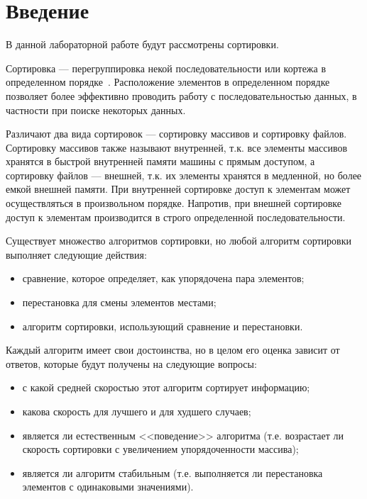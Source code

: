 \chapter*{Введение}

В данной лабораторной работе будут рассмотрены сортировки.

Сортировка --- перегруппировка некой последовательности или кортежа в определенном порядке~\cite{book_sort_algorithms}.
Расположение элементов в определенном порядке позволяет более эффективно проводить работу с последовательностью данных, в частности при поиске некоторых данных.

Различают два вида сортировок --- сортировку массивов и сортировку файлов.
Сортировку массивов также называют внутренней, т.к. все элементы массивов хранятся в быстрой внутренней памяти машины с прямым доступом, а сортировку файлов --- внешней, т.к. их элементы хранятся в медленной, но более емкой внешней памяти.
При внутренней сортировке доступ к элементам может осуществляться в произвольном порядке.
Напротив, при внешней сортировке доступ к элементам производится в строго определенной последовательности.

Существует множество алгоритмов сортировки, но любой алгоритм сортировки выполняет следующие действия:
\begin{itemize}
	\item сравнение, которое определяет, как упорядочена пара элементов;
	\item перестановка для смены элементов местами;
	\item алгоритм сортировки, использующий сравнение и перестановки.
\end{itemize}

Каждый алгоритм имеет свои достоинства, но в целом его оценка зависит от ответов, которые будут получены на следующие вопросы:
\begin{itemize}
	\item с какой средней скоростью этот алгоритм сортирует информацию;
	\item какова скорость для лучшего и для худшего случаев;
	\item является ли естественным <<поведение>> алгоритма (т.е. возрастает ли скорость сортировки с увеличением упорядоченности массива);
	\item является ли алгоритм стабильным (т.е. выполняется ли перестановка элементов с одинаковыми значениями).
\end{itemize}

